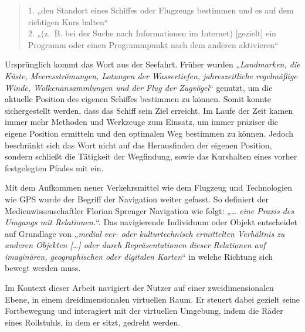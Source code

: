 \begin{quote}
    1. „den Standort eines Schiffes oder Flugzeugs bestimmen und es auf dem richtigen Kurs halten“\\
    2. „(z. B. bei der Suche nach Informationen im Internet) [gezielt] ein Programm oder einen Programmpunkt nach dem anderen aktivieren“
    \cite{DudenNavigierenRechtschreibung}
\end{quote}

Ursprünglich kommt das Wort aus der Seefahrt.
Früher wurden „\textit{Landmarken, die Küste, Meeresströmungen, Lotungen der Wassertiefen, jahreszeitliche regelmäßige Winde, Wolkenansammlungen und der Flug der Zugvögel}“\cite{wolfschmidtNavigareNecesseEst2008} genutzt, um die aktuelle Position des eigenen Schiffes bestimmen zu können.
Somit konnte sichergestellt werden, dass das Schiff sein Ziel erreicht.
Im Laufe der Zeit kamen immer mehr Methoden und Werkzeuge zum Einsatz, um immer präziser die eigene Position ermitteln und den optimalen Weg bestimmen zu können.
Jedoch beschränkt sich das Wort nicht auf das Herausfinden der eigenen Position, sondern schließt die Tätigkeit der Wegfindung, sowie das Kurshalten eines vorher festgelegten Pfades mit ein.

Mit dem Aufkommen neuer Verkehrsmittel wie dem Flugzeug und Technologien wie GPS wurde der Begriff der Navigation weiter gefasst.
So definiert der Medienwissenschaftler Florian Sprenger Navigation wie folgt: „\textit{… eine Praxis des Umgangs mit Relationen.}“\cite{sprengerNavigationenUndRelationen2022}.
Das navigierende Individuum oder Objekt entscheidet auf Grundlage von „\textit{medial ver- oder kulturtechnisch ermittelten Verhältnis zu anderen Objekten […] oder durch Repräsentationen dieser Relationen auf imaginären, geographischen oder digitalen Karten}“ in welche Richtung sich bewegt werden muss\cite{sprengerNavigationenUndRelationen2022}.

Im Kontext dieser Arbeit navigiert der Nutzer auf einer zweidimensionalen Ebene, in einem dreidimensionalen virtuellen Raum.
Er steuert dabei gezielt seine Fortbewegung und interagiert mit der virtuellen Umgebung, indem die Räder eines Rollstuhls, in dem er sitzt, gedreht werden.

